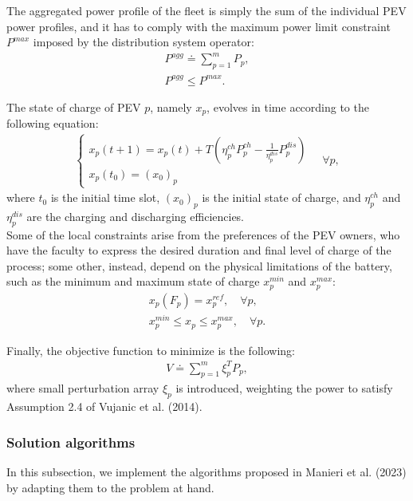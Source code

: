 The aggregated power profile of the fleet is simply the sum of the individual PEV power profiles, and it has to comply with the maximum power limit constraint $P^{max}$ imposed by the distribution system operator:
\begin{gather}
    P^{agg} \doteq \sum_{p=1}^m P_{p}, \label{constr:c5}\\
    P^{agg} \leq P^{max}. \label{constr:c6}
\end{gather}

The state of charge of PEV $p$, namely $x_p$, evolves in time according to the following equation:
\begin{align}
    \begin{cases}
        x_{p}(t+1) = x_{p}(t) + T (\eta^{ch}_p P^{ch}_{p} - \frac{1}{\eta^{dis}_p} P^{dis}_{p}) \label{constr:c7}\\
        x_{p}(t_0) = (x_0)_p
    \end{cases}
    \quad \forall p,
\end{align}
where $t_0$ is the initial time slot, $(x_0)_p$ is the initial state of charge, and $\eta^{ch}_p$ and $\eta^{dis}_p$ are the charging and discharging efficiencies.\\
Some of the local constraints arise from the preferences of the PEV owners, who have the faculty to express the desired duration and final level of charge of the process; some other, instead, depend on the physical limitations of the battery, such as the minimum and maximum state of charge $x^{min}_p$ and $x^{max}_p$:
\begin{gather}
    x_{p}(F_p) = x^{ref}_p, \quad \forall p, \label{constr:c8}\\
    x^{min}_p \leq x_{p} \leq x^{max}_p, \quad \forall p. \label{constr:c9}
\end{gather}

Finally, the objective function to minimize is the following:
\begin{align}
    V \doteq \sum_{p=1}^m \xi_{p}^T P_{p} \label{cost},
\end{align}
where small perturbation array $\xi_{p}$ is introduced, weighting the power to satisfy Assumption 2.4 of Vujanic et al. (2014)\supercite{vujanic}.

\subsubsection{Solution algorithms}
In this subsection, we implement the algorithms proposed in Manieri et al. (2023)\supercite{manieri} by adapting them to the problem at hand.

